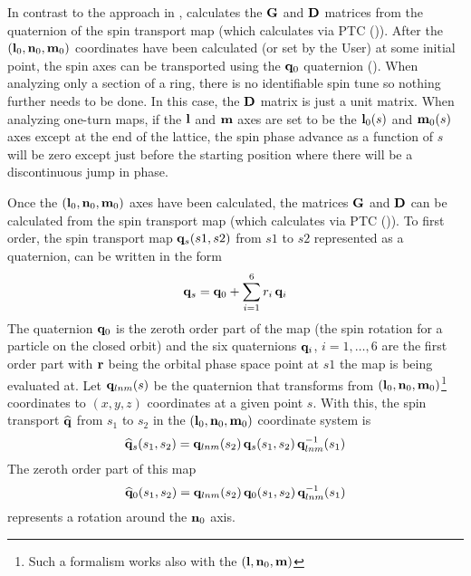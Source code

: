 {In contrast to the approach in \cite{b:barber85,b:barber99}, \bmad calculates the ${\bf G}$ and ${\bf D}$
matrices from the quaternion of the spin transport map (which \bmad calculates via PTC
()). After the $({\bf l}_0, {\bf n}_0, {\bf m}_0)$ coordinates have been calculated (or set by
the User) at some initial point, the spin axes can be transported using the ${\bf q}_0$ quaternion
(). When analyzing only a section of a ring, there is no identifiable spin tune so nothing
further needs to be done. In this case, the ${\bf D}$ matrix is just a unit matrix. When analyzing
one-turn maps, if the ${\bf l}$ and ${\bf m}$ axes are set to be the ${\bf l}_0(s)$ and ${\bf m}_0(s)$ axes
except at the end of the lattice, the spin phase advance as a function of $s$ will be zero except
just before the starting position where there will be a discontinuous jump in phase.

Once the $({\bf l}_0, {\bf n}_0, {\bf m}_0)$ axes have been calculated, the matrices ${\bf G}$ and ${\bf D}$
can be calculated from the spin transport map (which \bmad calculates via PTC ()). To
first order, the spin transport map ${\bf q}_s(s1, s2)$ from $s1$ to $s2$ represented as a
quaternion, can be written in the form
\begin{equation}
  {\bf q}_s = {\bf q}_0 + \sum_{i = 1}^6 r_i \, {\bf q}_i
  \label{qqrq}
\end{equation}
The quaternion ${\bf q}_0$ is the zeroth order part of the map (the spin rotation for a particle on the
closed orbit) and the six quaternions ${\bf q}_i$, $i = 1, \ldots, 6$ are the first order part with
${\bf r}$ being the orbital phase space point at $s1$ the map is being evaluated at. Let
${\bf q}_{lnm}(s)$ be the quaternion that transforms from $({\bf l}_0, {\bf n}_0, {\bf m}_0)$\footnote{
Such a formalism works also with the $({\bf l}, {\bf n}_0, {\bf m})$} coordinates to $(x, y, z)$
coordinates at a given point $s$. With this, the spin transport $\widehat{{\bf q}}$ from $s_1$ to $s_2$ in
the $({\bf l}_0, {\bf n}_0, {\bf m}_0)$ coordinate system is
\begin{equation}
  \widehat{{\bf q}}_s(s_1, s_2) = {\bf q}_{lnm}(s_2) \, {\bf q}_s(s_1, s_2) \, {\bf q}_{lnm}^{-1}(s_1)
\end{equation}
The zeroth order part of this map 
\begin{equation}
  \widehat{{\bf q}}_0(s_1,s_2) = {\bf q}_{lnm}(s_2) \, {\bf q}_0(s_1, s_2) \, {\bf q}_{lnm}^{-1}(s_1) 
\end{equation}
represents a rotation around the ${\bf n}_0$ axis. 

}
